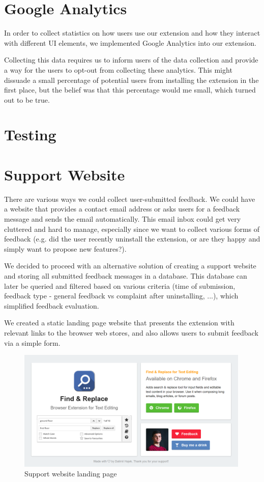 \documentclass[bsc,frontabs,twoside,singlespacing,parskip,deptreport]{infthesis}
\begin{document}
\section{Google Analytics}
In order to collect statistics on how users use our extension and how they interact with different UI elements, we implemented Google Analytics into our extension.

Collecting this data requires us to inform users of the data collection and provide a way for the users to opt-out from collecting these analytics. This might dissuade a small percentage of potential users from installing the extension in the first place, but the belief was that this percentage would me small, which turned out to be true.

\section{Testing}

\section{Support Website}
There are various ways we could collect user-submitted feedback. We could have a website that provides a contact email address or asks users for a feedback message and sends the email automatically. This email inbox could get very cluttered and hard to manage, especially since we want to collect various forms of feedback (e.g. did the user recently uninstall the extension, or are they happy and simply want to propose new features?). 

We decided to proceed with an alternative solution of creating a support website and storing all submitted feedback messages in a database. This database can later be queried and filtered based on various criteria (time of submission, feedback type - general feedback vs complaint after uninstalling, ...), which simplified feedback evaluation.

We created a static landing page website that presents the extension with relevant links to the browser web stores, and also allows users to submit feedback via a simple form.

\begin{figure}[h]
\centering
\includegraphics[width=0.99\textwidth]{../graphics/landing-page.png}
\caption{Support website landing page}
\end{figure}
\end{document}
